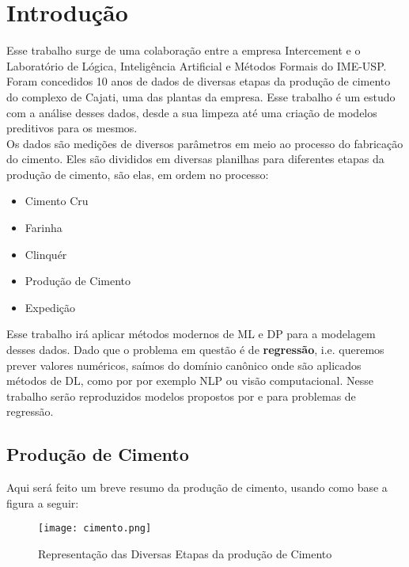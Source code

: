\chapter{Introdução}
\label{cap:introducao}


Esse trabalho surge de uma colaboração entre a empresa Intercement e o Laboratório de Lógica, Inteligência Artificial e Métodos Formais do IME-USP. Foram concedidos 10 anos de dados de diversas etapas da produção de cimento do complexo de Cajati, uma das plantas da empresa. Esse trabalho é um estudo com a análise desses dados, desde a sua limpeza até uma criação de modelos preditivos para os mesmos. \\

Os dados são medições de diversos parâmetros em meio ao processo do fabricação do cimento. Eles são divididos em diversas planilhas para diferentes etapas da produção de cimento, são elas, em ordem no processo:

\begin{itemize}
        \item Cimento Cru
        \item Farinha
        \item Clinquér
        \item Produção de Cimento
        \item Expedição
\end{itemize}


Esse trabalho irá aplicar métodos modernos de ML e DP para a modelagem desses dados. Dado que o problema em questão é de \textbf{regressão}, i.e. queremos prever valores numéricos, saímos do domínio canônico onde são aplicados métodos de DL, como por por exemplo NLP ou visão computacional. Nesse trabalho serão reproduzidos modelos propostos por \citet{ubertime} e \citet{energylstm} para problemas de regressão.



\section{Produção de Cimento}
\label{sec:producao}

Aqui será feito um breve resumo da produção de cimento, usando como base a figura a seguir: \\ 

\begin{figure}[H]
\centering
\texttt{[image: cimento.png]}
\caption{Representação das Diversas Etapas da produção de Cimento}
\end{figure}


